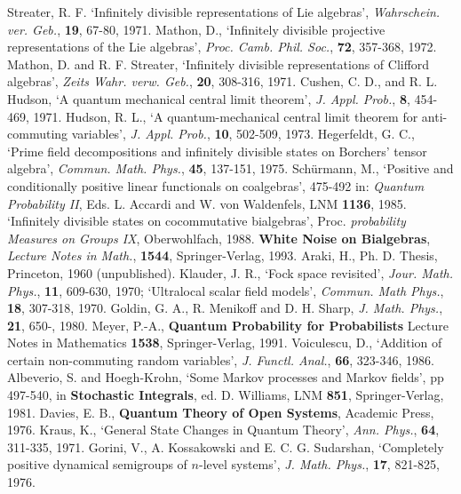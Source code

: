 \begin{thebibliography}{99}
 Streater, R. F. `Infinitely divisible representations of Lie
algebras', {\em Wahrschein. ver. Geb.}, {\bf 19}, 67-80, 1971.
 Mathon, D., `Infinitely divisible projective
representations of the Lie algebras', {\em Proc. Camb. Phil. Soc.}, {\bf 72},
357-368, 1972.
 Mathon, D. and R. F. Streater, `Infinitely divisible
representations of Clifford algebras', {\em Zeits Wahr. verw. Geb.},
{\bf 20}, 308-316, 1971.
 Cushen, C. D., and R. L. Hudson, `A quantum mechanical
central limit theorem', {\em J. Appl. Prob.}, {\bf 8}, 454-469, 1971.
 Hudson, R. L., `A quantum-mechanical central limit
theorem for anti-commuting variables', {\em J. Appl. Prob.}, {\bf 10},
502-509, 1973.
 Hegerfeldt, G. C., `Prime field decompositions and
infinitely divisible states on Borchers' tensor algebra', {\em Commun.
Math. Phys.}, {\bf 45}, 137-151, 1975.
 Sch\"{u}rmann, M., `Positive and conditionally positive
linear functionals on coalgebras', 475-492 in: {\em Quantum Probability II},
Eds. L. Accardi and W. von Waldenfels, LNM {\bf 1136}, 1985.
`Infinitely divisible states on cocommutative
bialgebras', Proc. {\em probability Measures on Groups IX}, Oberwohlfach,
1988. {\bf White Noise on Bialgebras}, {\em Lecture Notes in Math.},
{\bf 1544}, Springer-Verlag, 1993.
 Araki, H., Ph. D. Thesis, Princeton, 1960 (unpublished).
 Klauder, J. R., `Fock space revisited', {\em Jour.
Math. Phys.}, {\bf 11}, 609-630, 1970; `Ultralocal scalar field
models', {\em Commun. Math Phys.}, {\bf 18}, 307-318, 1970.
 Goldin, G. A., R. Menikoff and D. H. Sharp, {\em J. Math.
Phys.}, {\bf 21}, 650-, 1980.
 Meyer, P.-A., {\bf Quantum Probability for Probabilists}
Lecture Notes in Mathematics {\bf 1538}, Springer-Verlag, 1991.
 Voiculescu, D., `Addition of certain non-commuting
random variables', {\em J. Functl. Anal.}, {\bf 66}, 323-346, 1986.
 Albeverio, S. and Hoegh-Krohn, `Some Markov processes
and Markov fields', pp 497-540, in {\bf Stochastic Integrals},
ed. D. Williams, LNM {\bf 851}, Springer-Verlag, 1981.
 Davies, E. B., {\bf Quantum Theory of Open Systems},
Academic Press, 1976.
 Kraus, K., `General State Changes in Quantum Theory',
{\em Ann. Phys.}, {\bf 64}, 311-335, 1971.
 Gorini, V., A. Kossakowski and E. C. G. Sudarshan,
`Completely positive dynamical semigroups of $n$-level systems',
{\em J. Math. Phys.}, {\bf 17}, 821-825, 1976.

\end{thebibliography}
